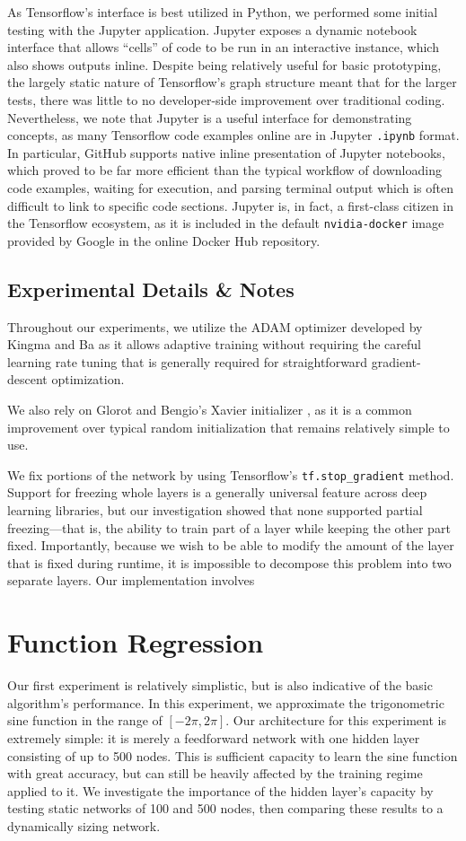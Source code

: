 As Tensorflow's interface is best utilized in Python, we performed some initial testing with the Jupyter application.
Jupyter exposes a dynamic notebook interface that allows ``cells'' of code to be run in an interactive instance, which also shows outputs inline.
Despite being relatively useful for basic prototyping, the largely static nature of Tensorflow's graph structure meant that for the larger tests, there was little to no developer-side improvement over traditional coding.
Nevertheless, we note that Jupyter is a useful interface for demonstrating concepts, as many Tensorflow code examples online are in Jupyter \texttt{.ipynb} format.
In particular, GitHub supports native inline presentation of Jupyter notebooks, which proved to be far more efficient than the typical workflow of downloading code examples, waiting for execution, and parsing terminal output which is often difficult to link to specific code sections.
Jupyter is, in fact, a first-class citizen in the Tensorflow ecosystem, as it is included in the default \texttt{nvidia-docker} image provided by Google in the online Docker Hub repository.

\subsection{Experimental Details \& Notes}
Throughout our experiments, we utilize the ADAM optimizer developed by Kingma and Ba \cite{kingma2014adam} as it allows adaptive training without requiring the careful learning rate tuning that is generally required for straightforward gradient-descent optimization.

We also rely on Glorot and Bengio's Xavier initializer \cite{glorot2010understanding}, as it is a common improvement over typical random initialization that remains relatively simple to use.

We fix portions of the network by using Tensorflow's \texttt{tf.stop\_gradient} method.
Support for freezing whole layers is a generally universal feature across deep learning libraries, but our investigation showed that none supported partial freezing---that is, the ability to train part of a layer while keeping the other part fixed.
Importantly, because we wish to be able to modify the amount of the layer that is fixed during runtime, it is impossible to decompose this problem into two separate layers.
Our implementation involves 


\section{Function Regression}
Our first experiment is relatively simplistic, but is also indicative of the basic algorithm's performance.
In this experiment, we approximate the trigonometric sine function in the range of $[-2\pi, 2\pi]$.
Our architecture for this experiment is extremely simple: it is merely a feedforward network with one hidden layer consisting of up to 500 nodes.
This is sufficient capacity to learn the sine function with great accuracy, but can still be heavily affected by the training regime applied to it.
We investigate the importance of the hidden layer's capacity by testing static networks of 100 and 500 nodes, then comparing these results to a dynamically sizing network.


